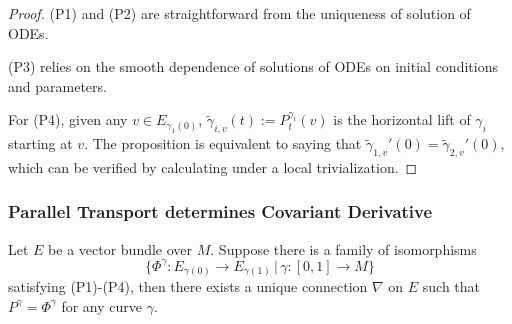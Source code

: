 \begin{proof}
    (P1) and (P2) are straightforward from the uniqueness of solution of ODEs. 

    (P3) relies on the smooth dependence of solutions of ODEs on initial conditions and parameters.

    For (P4), given any $v\in E_{\gamma_1(0)}$, $\tilde{\gamma}_{i,v}(t):=P^{\gamma_i}_t(v)$ 
    is the horizontal lift of $\gamma_i$ starting at $v$. 
    The proposition is equivalent to saying that $\tilde{\gamma}_{1,v}'(0) = \tilde{\gamma}_{2,v}'(0)$, 
    which can be verified by calculating under a local trivialization. 
\end{proof}

\subsubsection*{Parallel Transport determines Covariant Derivative}
\begin{theorem}
    Let $E$ be a vector bundle over $M$.
    Suppose there is a family of isomorphisms 
    \begin{equation*}
        \Big\{\Phi^\gamma: E_{\gamma(0)} \to E_{\gamma(1)} \,\Big|\, \gamma:[0,1] \to M\Big\}
    \end{equation*}
    satisfying (P1)-(P4), then there exists a unique connection $\nabla$ on $E$ such that 
    $P^\gamma = \Phi^\gamma$ for any curve $\gamma$.
\end{theorem}
